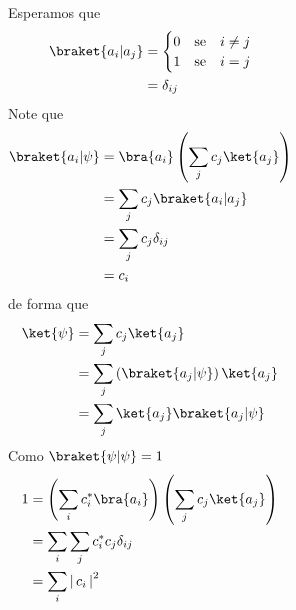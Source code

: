 \documentclass[12pt,brazil,table]{beamer}
\begin{document}
\begin{frame}
\begin{columns}[T]
  Esperamos que\vspace*{-0.5cm}
  \[
    \begin{align*}
      \braket{a_i|a_j} &= \begin{cases}
      0 & \text{se}\quad i\neq j\\
      1 & \text{se}\quad i = j
      \end{cases}\\
      &= \delta_{ij}
    \end{align*}\vspace*{-0.5cm}
  \]
   \vspace*{-0.5cm}
  Note que  \vspace*{-0.5cm}
  \[
  \begin{align*}
    \braket{a_i|\psi} &= \bra{a_i}\left( \sum_j c_j \ket{a_j}  \right)\\
    &= \sum_j c_j\braket{a_i|a_j}\\
    &= \sum_j c_j\delta_{ij}\\
    &=c_i
  \end{align*}\vspace*{-0.5cm}
  \]
  de forma que\vspace*{-0.5cm}
  \[
  \begin{align*}
    \ket{\psi} &=  \sum_j c_j \ket{a_j}\\
    &= \sum_j \left(\braket{a_j|\psi}\right)\ket{a_j}\\
    &= \sum_j \ket{a_j}\braket{a_j|\psi}
  \end{align*}\vspace*{-0.5cm}
  \]
  Como $\braket{\psi|\psi}=1$\vspace*{-0.25cm}
  \[
  \begin{align*}
    1 &= \left( \sum_i c_i^* \bra{a_i}  \right)\left( \sum_j c_j \ket{a_j}  \right)\\
     &= \sum_i\sum_j c_i^*c_j \delta_{ij}\\
    &= \sum_i \left|\, c_i  \,\right|^2
  \end{align*}\vspace*{-0.5cm}
  \]
  
  \end{columns}


\end{frame} 

\end{document}
